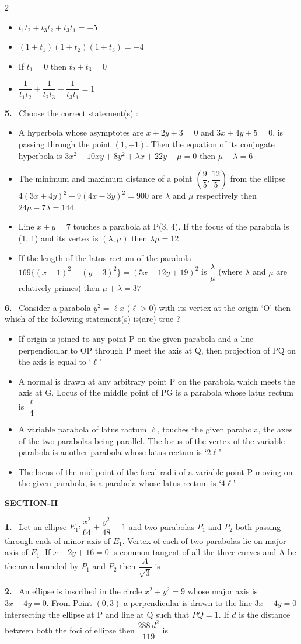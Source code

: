 \documentclass[10pt]{extarticle}
\newcommand{\sect}[1]{\par\smallskip\noindent\textbf{#1}\par}
\newcommand{\qn}[1]{\par\smallskip\noindent\textbf{#1.}~}
\newenvironment{qoptions}{\begin{itemize}[leftmargin=1.8em,itemsep=1pt,topsep=2pt,label={}]}{\end{itemize}}
\newcommand{\opt}[2]{\item[(#1)] #2}
\begin{document}
\begin{multicols}{2}
\begin{qoptions}
\opt{A}{$t_1t_2+t_3t_2+t_3t_1=-5$}
\opt{B}{$(1+t_1)(1+t_2)(1+t_3)=-4$}
\opt{C}{If $t_1=0$ then $t_2+t_3=0$}
\opt{D}{$\dfrac1{t_1t_2}+\dfrac1{t_2t_3}+\dfrac1{t_3t_1}=1$}
\end{qoptions}
\qn{5} Choose the correct statement(s) :
\begin{qoptions}
\opt{A}{A hyperbola whose asymptotes are $x+2y+3=0$ and $3x+4y+5=0$, is passing through the point $(1,-1)$. Then the equation of its conjugate hyperbola is $3x^2+10xy+8y^2+\lambda x+22y+\mu=0$ then $\mu-\lambda=6$}
\opt{B}{The minimum and maximum distance of a point $\left(\dfrac95,\dfrac{12}5\right)$ from the ellipse $4(3x+4y)^2+9(4x-3y)^2=900$ are $\lambda$ and $\mu$ respectively then $24\mu-7\lambda=144$}
\opt{C}{Line $x+y=7$ touches a parabola at P(3, 4). If the focus of the parabola is (1, 1) and its vertex is $(\lambda,\mu)$ then $\lambda\mu=12$}
\opt{D}{If the length of the latus rectum of the parabola $169\{(x-1)^2+(y-3)^2\}=(5x-12y+19)^2$ is $\dfrac\lambda\mu$ (where $\lambda$ and $\mu$ are relatively primes) then $\mu+\lambda=37$}
\end{qoptions}
\qn{6} Consider a parabola $y^2=\ell x$ ($\ell>0$) with its vertex at the origin `O' then which of the following statement(s) is(are) true ?
\begin{qoptions}
\opt{A}{If origin is joined to any point P on the given parabola and a line perpendicular to OP through P meet the axis at Q, then projection of PQ on the axis is equal to `$\ell$'}
\opt{B}{A normal is drawn at any arbitrary point P on the parabola which meets the axis at G. Locus of the middle point of PG is a parabola whose latus rectum is $\dfrac\ell4$}
\opt{C}{A variable parabola of latus ractum $\ell$, touches the given parabola, the axes of the two parabolas being parallel. The locus of the vertex of the variable parabola is another parabola whose latus rectum is `$2\ell$'}
\opt{D}{The locus of the mid point of the focal radii of a variable point P moving on the given parabola, is a parabola whose latus rectum is `$4\ell$'}
\end{qoptions}
\sect{SECTION-II}
\qn{1} Let an ellipse $E_1:\dfrac{x^2}{64}+\dfrac{y^2}{48}=1$ and two parabolas $P_1$ and $P_2$ both passing through ends of minor axis of $E_1$. Vertex of each of two parabolas lie on major axis of $E_1$. If $x-2y+16=0$ is common tangent of all the three curves and A be the area bounded by $P_1$ and $P_2$ then $\dfrac{A}{\sqrt3}$ is
\qn{2} An ellipse is inscribed in the circle $x^2+y^2=9$ whose major axis is $3x-4y=0$. From Point $(0,3)$ a perpendicular is drawn to the line $3x-4y=0$ intersecting the ellipse at P and line at Q such that $PQ=1$. If $d$ is the distance between both the foci of ellipse then $\dfrac{288\,d^2}{119}$ is

\end{multicols}
\end{document}
